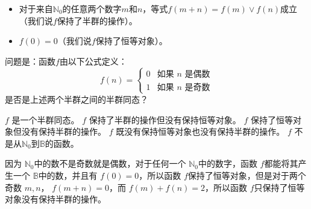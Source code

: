 \documentclass[answers]{exam}
\begin{document}
\begin{questions}
	\begin{itemize}
	\item 对于来自$\mathbb{N}_0$的任意两个数字$m$和$n$，等式$f(m + n) = f(m) \vee f(n)$成立（我们说$f$保持了半群的操作）。
	\item $f(0) = 0$（我们说$f$保持了恒等对象）。
	\end{itemize}

	问题是：函数$f$由以下公式定义：
	\[ f(n) =
		\begin{cases}
			0 & \text{如果 } n \text{ 是偶数} \\
			1 & \text{如果 } n \text{ 是奇数}
		\end{cases}
	\]
	是否是上述两个半群之间的半群同态？

	\begin{choices}
		\choice $f$ 是一个半群同态。
		\choice $f$ 保持了半群的操作但没有保持恒等对象。
		\CorrectChoice $f$ 保持了恒等对象但没有保持半群的操作。
		\choice $f$ 既没有保持恒等对象也没有保持半群的操作。
		\choice $f$ 不是从$\mathbb{N}_0$到$\mathbb{B}$的函数。
	\end{choices}

	\begin{solution}
		因为 \( \mathbb{N}_0 \)中的数不是奇数就是偶数，对于任何一个 \( \mathbb{N}_0 \)中的数字，函数 \( f
		\)都能将其产生一个 \( \mathbb{B} \)中的数，并且有 \( f(0) = 0 \)，所以函数 \( f
		\)保持了恒等对象，但是对于两个奇数 \( m,n \)， \( f(m+n) = 0   \)，而 \( f(m) + f(n) = 2 \)，所以函数 \( f
		\)只保持了恒等对象没有保持半群的操作。
	\end{solution}
\end{questions}
\end{document}
